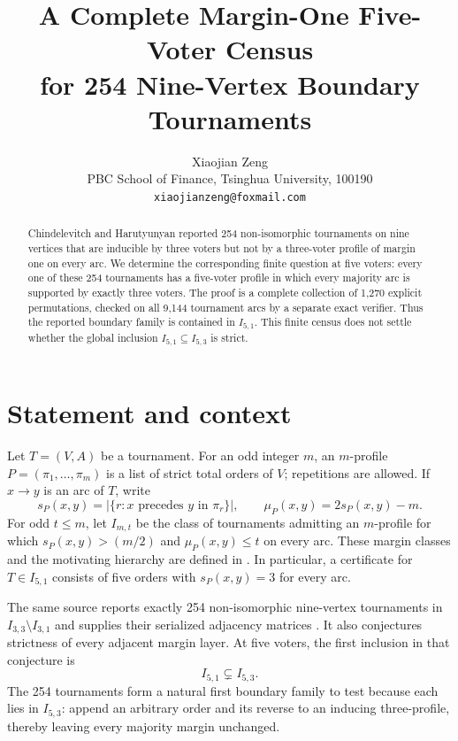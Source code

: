 \documentclass[11pt]{article}
\title{A Complete Margin-One Five-Voter Census\\
for 254 Nine-Vertex Boundary Tournaments}
\author{Xiaojian Zeng\\
PBC School of Finance, Tsinghua University, 100190\\
\texttt{xiaojianzeng@foxmail.com}}
\date{}
\begin{document}
\maketitle

\begin{abstract}
Chindelevitch and Harutyunyan reported 254 non-isomorphic tournaments on nine
vertices that are inducible by three voters but not by a three-voter profile
of margin one on every arc.  We determine the corresponding finite question
at five voters: every one of these 254 tournaments has a five-voter profile in
which every majority arc is supported by exactly three voters.  The proof is a
complete collection of 1,270 explicit permutations, checked on all 9,144
tournament arcs by a separate exact verifier.  Thus the reported boundary
family is contained in $I_{5,1}$.  This finite census does not settle whether
the global inclusion $I_{5,1}\subseteq I_{5,3}$ is strict.
\end{abstract}

\section{Statement and context}

Let $T=(V,A)$ be a tournament.  For an odd integer $m$, an $m$-profile
$P=(\pi_1,\ldots,\pi_m)$ is a list of strict total orders of $V$; repetitions
are allowed.  If $x\to y$ is an arc of $T$, write
\[
 s_P(x,y)=\bigl|\{r:x\text{ precedes }y\text{ in }\pi_r\}\bigr|,
 \qquad \mu_P(x,y)=2s_P(x,y)-m.
\]
For odd $t\leq m$, let $I_{m,t}$ be the class of tournaments admitting an
$m$-profile for which $s_P(x,y)>(m/2)$ and $\mu_P(x,y)\leq t$ on every arc.
These margin classes and the motivating hierarchy are defined in
\cite{ChindelevitchHarutyunyan2026}.  In particular, a certificate for
$T\in I_{5,1}$ consists of five orders with $s_P(x,y)=3$ for every arc.

The same source reports exactly 254 non-isomorphic nine-vertex tournaments in
$I_{3,3}\setminus I_{3,1}$ and supplies their serialized adjacency matrices
\cite{ChindelevitchHarutyunyan2026,CHData2026}.  It also conjectures strictness
of every adjacent margin layer.  At five voters, the first inclusion in that
conjecture is
\[
                 I_{5,1}\subsetneq I_{5,3}.
\]
The 254 tournaments form a natural first boundary family to test because each
lies in $I_{5,3}$: append an arbitrary order and its reverse to an inducing
three-profile, thereby leaving every majority margin unchanged.
\end{document}
